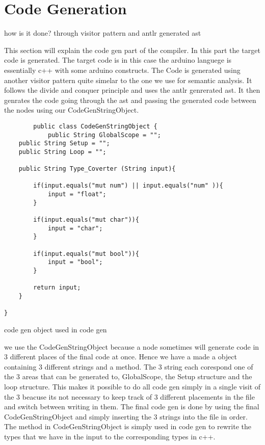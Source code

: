 \section{Code Generation}

how is it done? through visitor pattern and antlr generated ast


This section will explain the code gen part of the compiler. In this part the target
code is generated. The target code is in this case the arduino languege is essentially c++ with some arduino constructs. The Code is generated using another visitor pattern quite simelar to the one we use for semantic analysis. It follows the divide and conquer principle and uses the antlr genrerated ast. It then genrates the code going through the ast and passing the generated code between the nodes using our CodeGenStringObject.

\begin{listing}[htb!]
    \begin{verbatim}
        public class CodeGenStringObject {
            public String GlobalScope = "";
    public String Setup = "";
    public String Loop = "";

    public String Type_Coverter (String input){
        
        if(input.equals("mut num") || input.equals("num" )){
            input = "float";
        }
        
        if(input.equals("mut char")){
            input = "char";
        }

        if(input.equals("mut bool")){
            input = "bool";
        }
        
        return input;
    }
    
}
\end{verbatim}
\caption{code gen object used in code gen}
\label{lst:code gen object}
\end{listing}

we use the CodeGenStringObject because a node sometimes will generate code in 3 different places of the final code at once. Hence we have a made a object containing 3 different strings and a method. The 3 string each corespond one of the 3 areas that can be generated to, GlobalScope, the Setup structure and the loop structure. This makes it possible to do all code gen simply in a single visit of the 3 beacuse its not necessary to keep track of 3 different placements in the file and switch between writing in them. The final code gen is done by using the final CodeGenStringObject and simply inserting the 3 strings into the file in order.  The method in CodeGenStringObject is simply used in code gen to rewrite the types that we have in the input to the corresponding types in c++.







